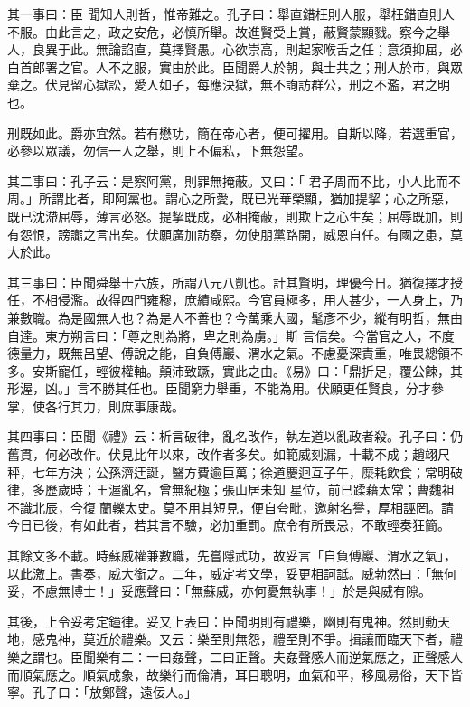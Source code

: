 \begin{pinyinscope}
 其一事曰：臣
 聞知人則哲，惟帝難之。孔子曰：舉直錯枉則人服，舉枉錯直則人不服。由此言之，政之安危，必慎所舉。故進賢受上賞，蔽賢蒙顯戮。察今之舉人，良異于此。無論諂直，莫擇賢愚。心欲崇高，則起家喉舌之任；意須抑屈，必白首郎署之官。人不之服，實由於此。臣聞爵人於朝，與士共之；刑人於市，與眾棄之。伏見留心獄訟，愛人如子，每應決獄，無不詢訪群公，刑之不濫，君之明也。



 刑既如此。爵亦宜然。若有懋功，簡在帝心者，便可擢用。自斯以降，若選重官，必參以眾議，勿信一人之舉，則上不偏私，下無怨望。



 其二事曰：孔子云：是察阿黨，則罪無掩蔽。又曰：「
 君子周而不比，小人比而不周。」所謂比者，即阿黨也。謂心之所愛，既已光華榮顯，猶加提挈；心之所惡，既已沈滯屈辱，薄言必怒。提挈既成，必相掩蔽，則欺上之心生矣；屈辱既加，則有怨恨，謗讟之言出矣。伏願廣加訪察，勿使朋黨路開，威恩自任。有國之患，莫大於此。



 其三事曰：臣聞舜舉十六族，所謂八元八凱也。計其賢明，理優今日。猶復擇才授任，不相侵濫。故得四門雍穆，庶績咸熙。今官員極多，用人甚少，一人身上，乃兼數職。為是國無人也？為是人不善也？今萬乘大國，髦彥不少，縱有明哲，無由自達。東方朔言曰：「尊之則為將，卑之則為虜。」斯
 言信矣。今當官之人，不度德量力，既無呂望、傅說之能，自負傅巖、渭水之氣。不慮憂深責重，唯畏總領不多。安斯寵任，輕彼權軸。顛沛致蹶，實此之由。《易》曰：「鼎折足，覆公餗，其形渥，凶。」言不勝其任也。臣聞窮力舉重，不能為用。伏願更任賢良，分才參掌，使各行其力，則庶事康哉。



 其四事曰：臣聞《禮》云：析言破律，亂名改作，執左道以亂政者殺。孔子曰：仍舊貫，何必改作。伏見比年以來，改作者多矣。如範威刻漏，十載不成；趙翊尺秤，七年方決；公孫濟迂誕，醫方費逾巨萬；徐道慶迴互子午，糜耗飲食；常明破律，多歷歲時；王渥亂名，曾無紀極；張山居未知
 星位，前已蹂藉太常；曹魏祖不識北辰，今復蘭轢太史。莫不用其短見，便自夸毗，邀射名譽，厚相誣罔。請今日已後，有如此者，若其言不驗，必加重罰。庶令有所畏忌，不敢輕奏狂簡。



 其餘文多不載。時蘇威權兼數職，先嘗隱武功，故妥言「自負傅巖、渭水之氣」，以此激上。書奏，威大銜之。二年，威定考文學，妥更相訶詆。威勃然曰：「無何妥，不慮無博士！」妥應聲曰：「無蘇威，亦何憂無執事！」於是與威有隙。



 其後，上令妥考定鐘律。妥又上表曰：臣聞明則有禮樂，幽則有鬼神。然則動天地，感鬼神，莫近於禮樂。又云：樂至則無怨，禮至則不爭。揖讓而臨天下者，禮
 樂之謂也。臣聞樂有二：一曰姦聲，二曰正聲。夫姦聲感人而逆氣應之，正聲感人而順氣應之。順氣成象，故樂行而倫清，耳目聰明，血氣和平，移風易俗，天下皆寧。孔子曰：「放鄭聲，遠佞人。」




\end{pinyinscope}
